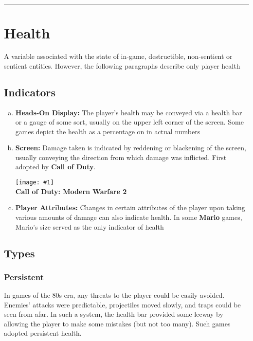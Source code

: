 \documentclass[12pt]{article}
\newcommand{\point}[1]{\item \textbf{#1:}}
\newcommand{\drawline}{\vspace{2mm}\hrule}
\newcommand{\fig}[3]{\begin{center} \texttt{[image: \#1]}\\ \textbf{#3} \end{center}}
\begin{document}
\drawline

\section{Health}

A variable associated with the state of in-game, destructible, non-sentient or sentient entities. However, the following paragraphs describe only player health

\subsection{Indicators}

\begin{enumerate}[a)]

\point{Heads-On Display} The player's health may be conveyed via a health bar or a gauge of some sort, usually on the upper left corner of the screen. Some games depict the health as a percentage on in actual numbers

\point{Screen} Damage taken is indicated by reddening or blackening of the screen, usually conveying the direction from which damage was inflicted. First adopted by \textbf{Call of Duty}.

\fig{call_of_duty.jpg}{0.5}{Call of Duty: Modern Warfare 2}

\point{Player Attributes} Changes in certain attributes of the player upon taking various amounts of damage can also indicate health. In some \textbf{Mario} games, Mario's size served as the only indicator of health

\end{enumerate}

\subsection{Types}

\subsubsection*{Persistent}

In games of the 80s era, any threats to the player could be easily avoided. Enemies' attacks were predictable, projectiles moved slowly, and traps could be seen from afar. In such a system, the health bar provided some leeway by allowing the player to make some mistakes (but not too many). Such games adopted persistent health.\\
\end{document}
